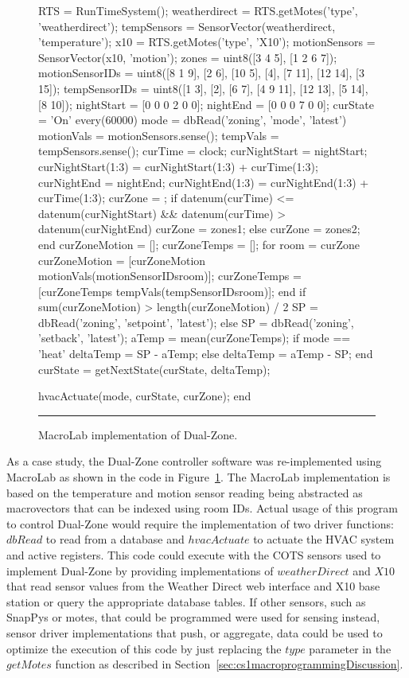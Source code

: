 \begin{figure}[!htb]
  \begin{macrolab}
RTS = RunTimeSystem();
weatherdirect = RTS.getMotes('type', 'weatherdirect');
tempSensors = SensorVector(weatherdirect, 'temperature');
x10 = RTS.getMotes('type', 'X10');
motionSensors = SensorVector(x10, 'motion');
zones = uint8({[3 4 5], [1 2 6 7]}); %
motionSensorIDs = uint8({[8 1 9], [2 6], [10 5], [4], [7 11], [12 14], [3 15]});
tempSensorIDs = uint8({[1 3], [2], [6 7], [4 9 11], [12 13], [5 14], [8 10]}); 
nightStart = [0 0 0 2 0 0];
nightEnd = [0 0 0 7 0 0];
curState = 'On'
every(60000)
  mode = dbRead('zoning', 'mode', 'latest')
  motionVals = motionSensors.sense();
  tempVals =  tempSensors.sense();
  curTime = clock;
  curNightStart = nightStart;
  curNightStart(1:3) = curNightStart(1:3) + curTime(1:3);
  curNightEnd = nightEnd;
  curNightEnd(1:3) = curNightEnd(1:3) + curTime(1:3);
  curZone = {};
  if datenum(curTime) <= datenum(curNightStart) && datenum(curTime) > datenum(curNightEnd)  
    curZone = zones{1};
  else
    curZone = zones{2};
  end
  curZoneMotion = [];
  curZoneTemps = [];
  for room = curZone
    curZoneMotion = [curZoneMotion motionVals(motionSensorIDs{room})];
    curZoneTemps = [curZoneTemps tempVals(tempSensorIDs{room})];
  end
  if sum(curZoneMotion) > length(curZoneMotion) / 2
    SP = dbRead('zoning', 'setpoint', 'latest');
  else
    SP = dbRead('zoning', 'setback', 'latest');
  aTemp = mean(curZoneTemps);
  if mode == 'heat'
    deltaTemp = SP - aTemp;
  else
    deltaTemp = aTemp - SP;
  end
  curState = getNextState(curState, deltaTemp);

  hvacActuate(mode, curState, curZone);
end
  \end{macrolab}
  \smallskip
  \hrule width 1\columnwidth
  \caption{MacroLab implementation of Dual-Zone.}
  \label{code:cs1}
\end{figure}

As a case study, the Dual-Zone controller software was re-implemented using
MacroLab as shown in the code in Figure~\ref{code:cs1}. The MacroLab
implementation is based on the temperature and motion sensor reading being
abstracted as macrovectors that can be indexed using room IDs. Actual usage of
this program to control Dual-Zone would require the implementation of two driver
functions: $dbRead$ to read from a database and $hvacActuate$ to actuate the
HVAC system and active registers. This code could execute with the COTS sensors
used to implement Dual-Zone by providing implementations of $weatherDirect$ and
$X10$ that read sensor values from the Weather Direct web interface and X10 base
station or query the appropriate database tables. If other sensors, such as
SnapPys or motes, that could be programmed were used for sensing instead, sensor
driver implementations that push, or aggregate, data could be used to optimize
the execution of this code by just replacing the $type$ parameter in the
$getMotes$ function as described in
Section~\ref{sec:cs1macroprogrammingDiscussion}.

